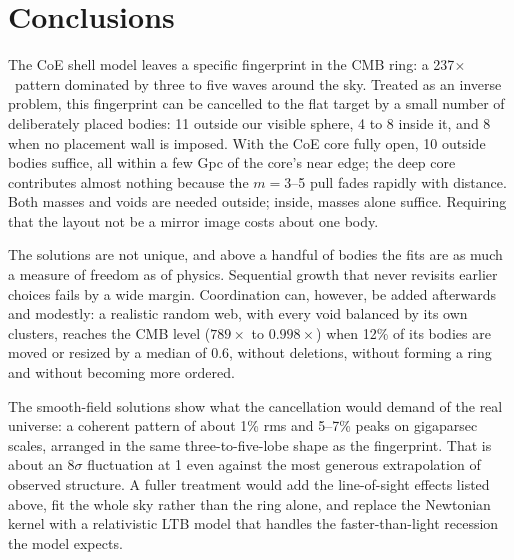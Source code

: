 \documentclass[aps,prd,twocolumn,nofootinbib,superscriptaddress,floatfix]{revtex4-2}
\newcommand{\fl}{\ensuremath{\times}}
\begin{document}
\section{Conclusions}
The CoE shell model leaves a specific fingerprint in the CMB ring: a 237\fl\ pattern dominated by three to five waves around the sky. Treated as an inverse problem, this fingerprint can be cancelled to the flat target by a small number of deliberately placed bodies: 11 outside our visible sphere, 4 to 8 inside it, and 8 when no placement wall is imposed. With the CoE core fully open, 10 outside bodies suffice, all within a few Gpc of the core's near edge; the deep core contributes almost nothing because the $m=3$--5 pull fades rapidly with distance. Both masses and voids are needed outside; inside, masses alone suffice. Requiring that the layout not be a mirror image costs about one body.

The solutions are not unique, and above a handful of bodies the fits are as much a measure of freedom as of physics. Sequential growth that never revisits earlier choices fails by a wide margin. Coordination can, however, be added afterwards and modestly: a realistic random web, with every void balanced by its own clusters, reaches the CMB level ($789\times$ to $0.998\times$) when 12\% of its bodies are moved or resized by a median of \SI{0.6}{\Gpc}, without deletions, without forming a ring and without becoming more ordered.

The smooth-field solutions show what the cancellation would demand of the real universe: a coherent pattern of about 1\% rms and 5--7\% peaks on gigaparsec scales, arranged in the same three-to-five-lobe shape as the fingerprint. That is about an $8\sigma$ fluctuation at \SI{1}{\Gpc} even against the most generous extrapolation of observed structure. A fuller treatment would add the line-of-sight effects listed above, fit the whole sky rather than the ring alone, and replace the Newtonian kernel with a relativistic LTB model that handles the faster-than-light recession the model expects.


\clearpage

\end{document}
